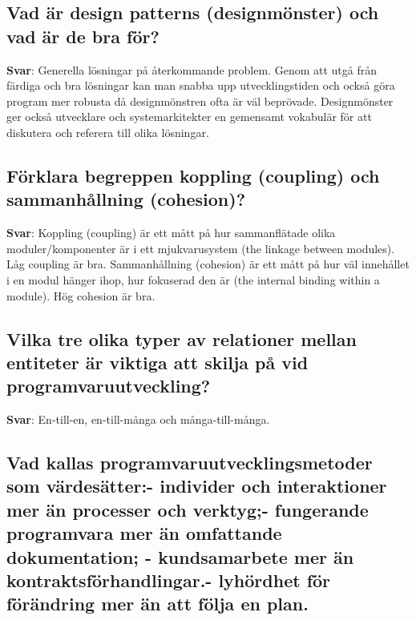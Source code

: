 \documentclass[a4paper,11pt,oneside]{article}
\begin{document}
\begin{sloppypar}
\subsection{Vad \"ar design patterns (designm\"onster) och vad \"ar de bra f\"or?}

\label{q:238:sa:sv:True}

\textbf{Svar}: Generella l\"osningar p\r{a} \r{a}terkommande problem. Genom att utg\r{a} fr\r{a}n f\"ardiga och bra l\"osningar kan man snabba upp utvecklingstiden och ocks\r{a} g\"ora program mer robusta d\r{a} designm\"onstren ofta \"ar v\"al bepr\"ovade. Designm\"onster ger ocks\r{a} utvecklare och systemarkitekter en gemensamt vokabul\"ar f\"or att diskutera och referera till olika l\"osningar.



\subsection{F\"orklara begreppen koppling (coupling) och sammanh\r{a}llning (cohesion)?}

\label{q:239:sa:sv:True}

\textbf{Svar}: Koppling (coupling) \"ar ett m\r{a}tt p\r{a} hur sammanfl\"atade olika moduler/komponenter \"ar i ett mjukvarusystem (the linkage between modules). L\r{a}g coupling \"ar bra. Sammanh\r{a}llning (cohesion) \"ar ett m\r{a}tt p\r{a} hur v\"al inneh\r{a}llet i en modul h\"anger ihop, hur fokuserad den \"ar (the internal binding within a module). H\"og cohesion \"ar bra.



\subsection{Vilka tre olika typer av relationer mellan entiteter \"ar viktiga att skilja p\r{a} vid programvaruutveckling?}

\label{q:240:sa:sv:True}

\textbf{Svar}: En-till-en, en-till-m\r{a}nga och m\r{a}nga-till-m\r{a}nga.



\subsection{Vad kallas programvaruutvecklingsmetoder som v\"ardes\"atter:- individer och interaktioner mer \"an processer och verktyg;- fungerande programvara mer \"an omfattande dokumentation; - kundsamarbete mer \"an kontraktsf\"orhandlingar.- lyh\"ordhet f\"or f\"or\"andring mer \"an att f\"olja en plan.}


\end{sloppypar}
\end{document}
